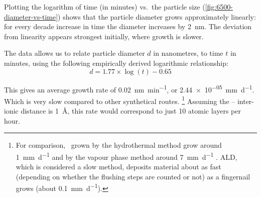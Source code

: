 \documentclass[webedition,openright,titles,swedish,english]{LuaUUThesis}\usepackage[]{graphicx}\usepackage[]{xcolor}
\newcommand{\vs}{vs.}
\begin{document}
Plotting the logarithm of time (in minutes) \vs\ the particle size (\cref{fig:6500-diameter-vs-time})
shows that the particle diameter grows approximately linearly: for every decade
increase in time the diameter increases by \qty{2}{\nm}.
The deviation from linearity appears strongest initially, where growth is slower.

The data allows us to relate particle diameter $d$ in nanometres, to time $t$ in minutes,
using the following empirically derived logarithmic relationship:
\begin{equation}
d = 1.77 \times
   \log(t) - 0.65
\end{equation}

This gives an average growth rate of
\qty[per-mode=symbol]{0.02}{\nm\per\minute},
or
\qty[per-mode=symbol]{2.44e-05}{\mm\per\day}.
Which is very slow compared to other synthetical routes.%
\footnote{%
   For comparison, \ZnO\ grown by the hydrothermal method
   grow around \qty[per-mode=symbol]{1}{\mm\per\day}
   and by the vapour phase method around \qty[per-mode=symbol]{7}{\mm\per\day}
   \cite{Jacobs2010,Schulz2008}.
   \Gls{ALD}, which is considered a slow method, deposits material
   about as fast (depending on whether the flushing steps are counted or not)
   as a fingernail grows (about \qty{0.1}{\mm\per\day}).
}
Assuming the -- inter-ionic distance is \qty{1}{\angstrom},
this rate would correspond to just \num{10} atomic layers per hour.


\clearpage
%

%




































%
\end{document}
